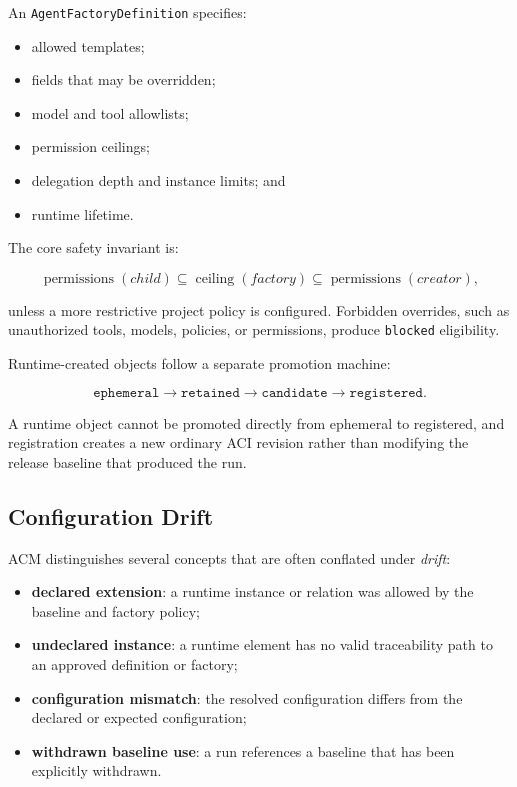 \documentclass[10pt]{article}
\begin{document}
An \texttt{AgentFactoryDefinition} specifies:

\begin{itemize}[leftmargin=*]
  \item allowed templates;
  \item fields that may be overridden;
  \item model and tool allowlists;
  \item permission ceilings;
  \item delegation depth and instance limits; and
  \item runtime lifetime.
\end{itemize}

The core safety invariant is:

\begin{equation}
\operatorname{permissions}(child) \subseteq \operatorname{ceiling}(factory)
\subseteq \operatorname{permissions}(creator),
\end{equation}

unless a more restrictive project policy is configured. Forbidden overrides, such as unauthorized tools, models, policies, or permissions, produce \texttt{blocked} eligibility.

Runtime-created objects follow a separate promotion machine:

\[
\texttt{ephemeral}\rightarrow\texttt{retained}\rightarrow\texttt{candidate}\rightarrow\texttt{registered}.
\]

A runtime object cannot be promoted directly from ephemeral to registered, and registration creates a new ordinary ACI revision rather than modifying the release baseline that produced the run.

\subsection{Configuration Drift}

ACM distinguishes several concepts that are often conflated under \emph{drift}:

\begin{itemize}[leftmargin=*]
  \item \textbf{declared extension}: a runtime instance or relation was allowed by the baseline and factory policy;
  \item \textbf{undeclared instance}: a runtime element has no valid traceability path to an approved definition or factory;
  \item \textbf{configuration mismatch}: the resolved configuration differs from the declared or expected configuration;
  \item \textbf{withdrawn baseline use}: a run references a baseline that has been explicitly withdrawn.
\end{itemize}
\end{document}
